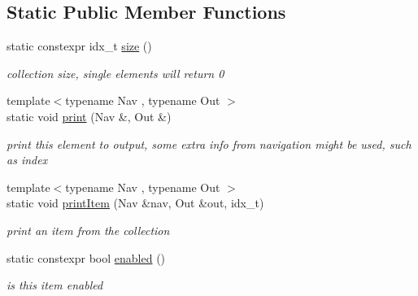 \subsection*{Static Public Member Functions}
\begin{DoxyCompactItemize}
\item 
\mbox{\label{structEmpty_aa55ba35b88a3aab4015d73002b8711b1}} 
static constexpr idx\+\_\+t \hyperlink{structEmpty_aa55ba35b88a3aab4015d73002b8711b1}{size} ()
\begin{DoxyCompactList}\small\item\em collection size, single elements will return 0 \end{DoxyCompactList}\item 
\mbox{\label{structEmpty_ad8bf9e6c8a9ebee45aecedbf257bf0c4}} 
{\footnotesize template$<$typename Nav , typename Out $>$ }\\static void \hyperlink{structEmpty_ad8bf9e6c8a9ebee45aecedbf257bf0c4}{print} (Nav \&, Out \&)
\begin{DoxyCompactList}\small\item\em print this element to output, some extra info from navigation might be used, such as index \end{DoxyCompactList}\item 
\mbox{\label{structEmpty_a7375fdf4da65d02878ee0ec34e08cead}} 
{\footnotesize template$<$typename Nav , typename Out $>$ }\\static void \hyperlink{structEmpty_a7375fdf4da65d02878ee0ec34e08cead}{print\+Item} (Nav \&nav, Out \&out, idx\+\_\+t)
\begin{DoxyCompactList}\small\item\em print an item from the collection \end{DoxyCompactList}\item 
\mbox{\label{structEmpty_af77e247ba15357510985e60bb676b897}} 
static constexpr bool \hyperlink{structEmpty_af77e247ba15357510985e60bb676b897}{enabled} ()
\begin{DoxyCompactList}\small\item\em is this item enabled \end{DoxyCompactList}\item 
\mbox{\label{structEmpty_a47e5e4377e0715fda8b083253ec94af1}} 

\end{DoxyCompactItemize}
